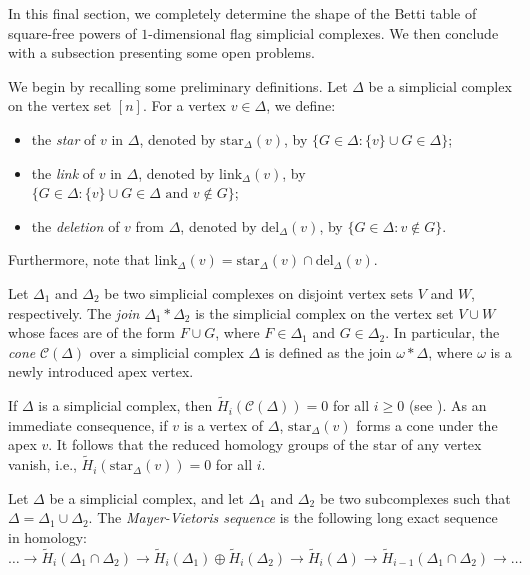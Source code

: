 \documentclass[12pt]{amsart}
\newcommand{\cC}{\mathcal{C}}
\begin{document}
In this final section, we completely determine the shape of the Betti table of square-free powers of $1$-dimensional flag simplicial complexes. We then conclude with a subsection presenting some open problems. 

We begin by recalling some preliminary definitions. Let $\Delta$ be a simplicial complex on the vertex set $[n]$. For a vertex $v \in \Delta$, we define:
\begin{itemize}
    \item the \textit{star} of $v$ in $\Delta$, denoted by $\text{star}_\Delta(v)$, by $\{G \in \Delta : \{v\} \cup G \in \Delta\}$;
    \item the \textit{link} of $v$ in $\Delta$, denoted by $\text{link}_\Delta(v)$, by $\{G \in \Delta : \{v\} \cup G \in \Delta \text{ and } v \notin G\}$;
    \item the \textit{deletion} of $v$ from $\Delta$, denoted by $\text{del}_\Delta(v)$, by  $\{G \in \Delta : v \notin G\}$.
\end{itemize}
Furthermore, note that $\text{link}_\Delta(v) = \text{star}_\Delta(v) \cap \text{del}_\Delta(v)$.

Let $\Delta_1$ and $\Delta_2$ be two simplicial complexes on disjoint vertex sets $V$ and $W$, respectively. The \textit{join} $\Delta_1 * \Delta_2$ is the simplicial complex on the vertex set $V \cup W$ whose faces are of the form $F \cup G$, where $F \in \Delta_1$ and $G \in \Delta_2$. In particular, the \textit{cone} $\cC(\Delta)$ over a simplicial complex $\Delta$ is defined as the join $\omega * \Delta$, where $\omega$ is a newly introduced apex vertex.

If $\Delta$ is a simplicial complex, then $\tilde{H}_i(\cC(\Delta)) = 0$ for all $i \ge 0$ (see \cite[Proposition 5.2.5]{Villarreal}). As an immediate consequence, if $v$ is a vertex of $\Delta$, $\text{star}_\Delta(v)$ forms a cone under the apex $v$. It follows that the reduced homology groups of the star of any vertex vanish, i.e., $\tilde{H}_i(\text{star}_\Delta(v)) = 0$ for all $i$.

Let $\Delta$ be a simplicial complex, and let $\Delta_1$ and $\Delta_2$ be two subcomplexes such that $\Delta = \Delta_1 \cup \Delta_2$. The \textit{Mayer-Vietoris sequence} is the following long exact sequence in homology:
\[ \dots \longrightarrow \tilde{H}_i(\Delta_1 \cap \Delta_2) \longrightarrow\tilde{H}_i(\Delta_1) \oplus \tilde{H}_i(\Delta_2) \longrightarrow \tilde{H}_i(\Delta) \longrightarrow \tilde{H}_{i-1}(\Delta_1 \cap \Delta_2) \longrightarrow \dots \]
\end{document}

